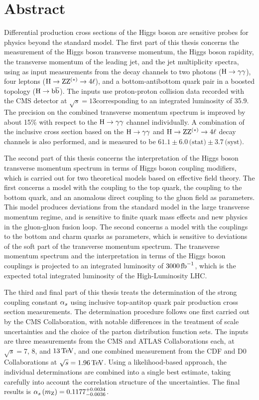 \section*{Abstract}

Differential production cross sections of the Higgs boson are sensitive probes for physics beyond the standard model.
% 
The first part of this thesis concerns the measurement of the Higgs boson transverse momentum, the Higgs boson rapidity, the transverse momentum of the leading jet, and the jet multiplicity spectra, using as input measurements from the decay channels to two photons ($\mathrm{H}\to\mathrm{\gamma}\mathrm{\gamma}$), four leptons ($\mathrm{H}\to\mathrm{Z}\mathrm{Z}^{(\ast)}\to 4\ell$), and a bottom-antibottom quark pair in a boosted topology ($\mathrm{H}\to\mathrm{b}\overline{\mathrm{b}}$).
% 
The inputs use proton-proton collision data recorded with the CMS detector at $\sqrt{s}=13$\TeV corresponding to an integrated luminosity of 35.9\fbinv.
% 
The precision on the combined transverse momentum spectrum is improved by about 15\% with respect to the $\mathrm{H}\to\mathrm{\gamma}\mathrm{\gamma}$ channel individually.
% 
A combination of the inclusive cross section based on the $\mathrm{H}\to\mathrm{\gamma}\mathrm{\gamma}$ and $\mathrm{H}\to\mathrm{Z}\mathrm{Z}^{(\ast)}\to 4\ell$ decay channels is also performed, and is measured to be $61.1   \pm 6.0 \,\text{(stat)} \pm 3.7 \,\text{(syst)}$\pb.


The second part of this thesis concerns the interpretation of the Higgs boson transverse momentum spectrum in terms of Higgs boson coupling modifiers, which is carried out for two theoretical models based on effective field theory.
% 
The first concerns a model with the coupling to the top quark, the coupling to the bottom quark, and an anomalous direct coupling to the gluon field as parameters.
% 
This model produces deviations from the standard model in the large transverse momentum regime, and is sensitive to finite quark mass effects and new physics in the gluon-gluon fusion loop.
% 
The second concerns a model with the couplings to the bottom and charm quarks as parameters, which is sensitive to deviations of the soft part of the transverse momentum spectrum.
% 
The transverse momentum spectrum and the interpretation in terms of the Higgs boson couplings is projected to an integrated luminosity of $3000\,\text{fb}^{-1}$, which is the expected total integrated luminosity of the High-Luminosity LHC.


The third and final part of this thesis treats the determination of the strong coupling constant $\alpha_s$ using inclusive top-antitop quark pair production cross section measurements.
% 
The determination procedure follows one first carried out by the CMS Collaboration, with notable differences in the treatment of scale uncertainties and the choice of the parton distribution function sets.
% 
The inputs are three measurements from the CMS and ATLAS Collaborations each, at $\sqrt{s}=7$, $8$, and $13\,\text{TeV}$, and one combined measurement from the CDF and D0 Collaborations at $\sqrt{s}=1.96\,\text{TeV}$.
% 
Using a likelihood-based approach, the individual determinations are combined into a single best estimate, taking carefully into account the correlation structure of the uncertainties.
% 
The final results is $\alpha_s \left( m_\mathrm{Z} \right)  = 0.1177^{+0.0034}_{-0.0036}$.



